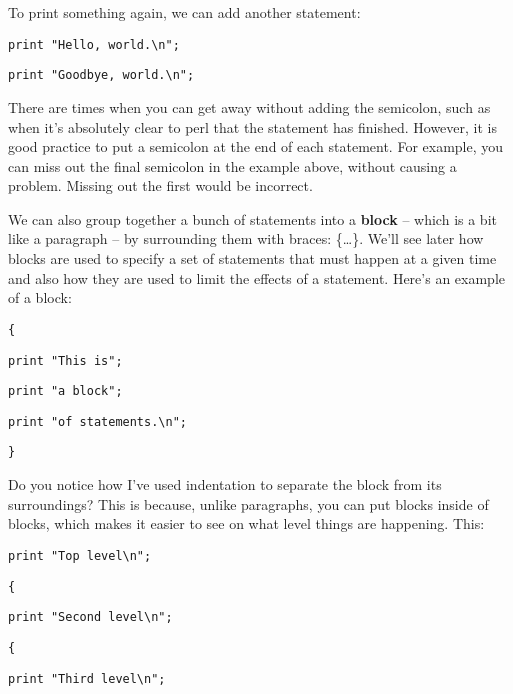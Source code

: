 \documentclass[a4paper,12pt,twoside]{book}
\begin{document}
\noindent 

\noindent To print something again, we can add another statement:

\noindent 

\noindent 

\noindent \texttt{print "Hello, world.\textbackslash n";}

\noindent \texttt{print "Goodbye, world.\textbackslash n";}

\noindent 

\noindent There are times when you can get away without adding the semicolon, 
such as when it's absolutely clear to perl that the statement has finished. 
However, it is good practice to put a semicolon at the end of each statement. 
For example, you can miss out the final semicolon in the example above, 
without causing a problem. Missing out the first would be incorrect.\medskip

\noindent 

\noindent We can also group together a bunch of statements into a \textbf{block }-- which is a bit like a paragraph -- by surrounding them with braces: \{\dots \}. We'll see later how blocks are used to specify a set of statements that must happen at a given time and also how they are used to limit the effects of a statement. Here's an example of a block:

\noindent 

\noindent \texttt{\{}

\noindent \texttt{print "This is";}

\noindent \texttt{print "a block";}

\noindent \texttt{print "of statements.\textbackslash n";}

\noindent \texttt{\}}

\noindent 

\noindent Do you notice how I've used indentation to separate the block from its surroundings? This is because, unlike paragraphs, you can put blocks inside of blocks, which makes it easier to see on what level things are happening. This:

\noindent 

\noindent \texttt{print "Top level\textbackslash n";}

\noindent \texttt{\{}

\noindent \texttt{print "Second level\textbackslash n";}

\noindent \texttt{\{}

\noindent \texttt{print "Third level\textbackslash n";}
\end{document}

